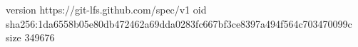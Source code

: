 version https://git-lfs.github.com/spec/v1
oid sha256:1da6558b05e80db472462a69dda0283fc667bf3ce8397a494f564c703470099c
size 349676
